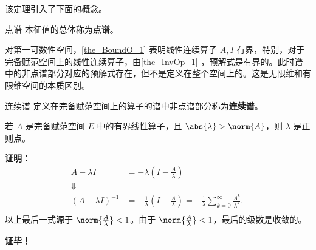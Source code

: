 该定理引入了下面的概念。
\begin{definition}{点谱}
本征值的总体称为\textbf{点谱}。
\end{definition}

对第一可数性空间，\autoref{the_BoundO_1} 表明线性连续算子 $A,I$ 有界，特别，对于完备赋范空间上的线性连续算子，由\autoref{the_InvOp_1} ，预解式是有界的。此时谱中的非点谱部分对应的预解式存在，但不是定义在整个空间上的。这是无限维和有限维空间的本质区别。

\begin{definition}{连续谱}
定义在完备赋范空间上的算子的谱中非点谱部分称为\textbf{连续谱}。
\end{definition}



\begin{theorem}{}
若 $A$ 是完备赋范空间 $E$ 中的有界线性算子，且 $\abs{\lambda}>\norm{A}$，则 $\lambda$ 是正则点。
\end{theorem}

\textbf{证明：} 
\begin{equation}
\begin{aligned}
A-\lambda I&=-\lambda(I-\frac{A}{\lambda})\\
\Downarrow\\
(A-\lambda I)^{-1}&=-\frac{1}{\lambda}(I-\frac{A}{\lambda})=-\frac{1}{\lambda}\sum_{k=0}^\infty\frac{A^k}{\lambda^k}.\\
\end{aligned}~
\end{equation}
以上最后一式源于 $\norm{\frac{A}{\lambda}}<1$。由于 $\norm{\frac{A}{\lambda}}<1$，最后的级数是收敛的。


\textbf{证毕！}